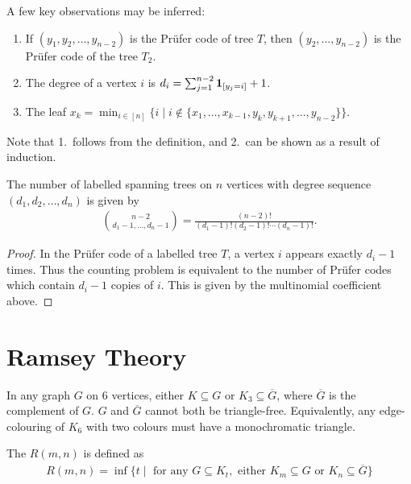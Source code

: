 A few key observations may be inferred:
\begin{enumerate}
    \item If $(y_{1},y_{2},\ldots,y_{n-2})$ is the Prüfer code of tree $T$, then $(y_{2},\ldots,y_{n-2})$ is the Prüfer code of the tree $T_{2}$.
    \item The degree of a vertex $i$ is $d_{i} = \sum_{j=1}^{n-2} \textbf{1}_{[y_{j}=i]} + 1$.
    \item The leaf $x_{k} = \min_{i \in [n]}\{i \mid i \notin \{x_{1},\ldots,x_{k-1},y_{k},y_{k+1},\ldots,y_{n-2}\}\}$.
\end{enumerate}
Note that 1.~follows from the definition, and 2.~can be shown as a result of induction.

\begin{theorem}
    The number of labelled spanning trees on $n$ vertices with degree sequence $(d_{1},d_{2},\ldots,d_{n})$ is given by
    \begin{align}
        \binom{n-2}{d_{1}-1,\ldots,d_{n}-1} = \frac{(n-2)!}{(d_{1}-1)!(d_{2}-1)!\cdots(d_{n}-1)!}.
    \end{align}
\end{theorem}
\begin{proof}
    In the Prüfer code of a labelled tree $T$, a vertex $i$ appears exactly $d_{i}-1$ times. Thus the counting problem is equivalent to the number of Prüfer codes which contain $d_{i}-1$ copies of $i$. This is given by the multinomial coefficient above.
\end{proof}

\section{Ramsey Theory}

In any graph $G$ on $6$ vertices, either $K \subseteq G$ or $K_{3} \subseteq \overline{G}$, where $\overline{G}$ is the complement of $G$. $G$ and $\overline{G}$ cannot both be triangle-free. Equivalently, any edge-colouring of $K_{6}$ with two colours must have a monochromatic triangle.

\begin{definition}
    The  $R(m,n)$ is defined as
    \begin{align}
        R(m,n) = \inf \{t \mid \text{ for any } G \subseteq K_{t}, \text{ either } K_{m} \subseteq G \text{ or } K_{n} \subseteq \overline{G}\}
    \end{align}
\end{definition}

